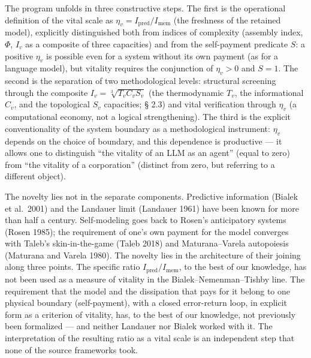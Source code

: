 \documentclass[pdflatex,sn-mathphys-ay]{sn-jnl}
\begin{document}
The program unfolds in three constructive steps. The first is the operational definition of the vital scale as \(\eta_v = I_{\text{pred}}/I_{\text{mem}}\) (the freshness of the retained model), explicitly distinguished both from indices of complexity (assembly index, \(\Phi\), \(I_v\) as a composite of three capacities) and from the self-payment predicate \(S\): a positive \(\eta_v\) is possible even for a system without its own payment (as for a language model), but vitality requires the conjunction of \(\eta_v > 0\) and \(S = 1\). The second is the separation of two methodological levels: structural screening through the composite \(I_v = \sqrt[3]{T_v C_v S_v}\) (the thermodynamic \(T_v\), the informational \(C_v\), and the topological \(S_v\) capacities; § 2.3) and vital verification through \(\eta_v\) (a computational economy, not a logical strengthening). The third is the explicit conventionality of the system boundary as a methodological instrument: \(\eta_v\) depends on the choice of boundary, and this dependence is productive --- it allows one to distinguish ``the vitality of an LLM as an agent'' (equal to zero) from ``the vitality of a corporation'' (distinct from zero, but referring to a different object).

The novelty lies not in the separate components. Predictive information (Bialek et al.~2001) and the Landauer limit (Landauer 1961) have been known for more than half a century. Self-modeling goes back to Rosen's anticipatory systems (Rosen 1985); the requirement of one's own payment for the model converges with Taleb's skin-in-the-game (Taleb 2018) and Maturana--Varela autopoiesis (Maturana and Varela 1980). The novelty lies in the architecture of their joining along three points. The specific ratio \(I_{\text{pred}}/I_{\text{mem}}\), to the best of our knowledge, has not been used as a measure of vitality in the Bialek--Nemenman--Tishby line. The requirement that the model and the dissipation that pays for it belong to one physical boundary (self-payment), with a closed error-return loop, in explicit form as a criterion of vitality, has, to the best of our knowledge, not previously been formalized --- and neither Landauer nor Bialek worked with it. The interpretation of the resulting ratio as a vital scale is an independent step that none of the source frameworks took.
\end{document}
